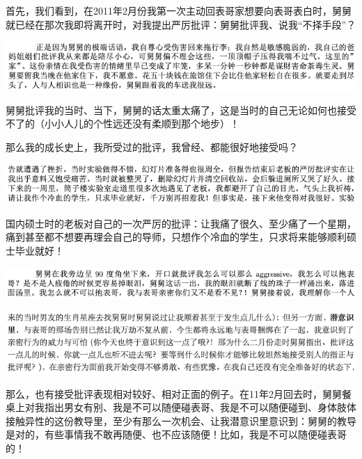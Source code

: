 \documentclass[9pt, b5paper]{article}
\begin{document}
首先，我们看到，在2011年2月份我第一次主动回表哥家想要向表哥表白时，舅舅就已经在那次我即将离开时，对我提出严厉批评：舅舅批评我、说我“不择手段”？

\begin{center}
\includegraphics[width=.9\linewidth]{./pic/backups_plans_20210412_110028.png}
\end{center}

舅舅批评我的当时、当下，舅舅的话太重太痛了，这是当时的自己无论如何也接受不了的（小小人儿的个性远还没有柔顺到那个地步）！

那么我的成长史上，我所受过的批评，我曾经、都能很好地接受吗？

\begin{center}
\includegraphics[width=.9\linewidth]{./pic/backups_plans_20210412_110225.png}
\end{center}

国内硕士时的老板对自己的一次严厉的批评：让我痛了很久、至少痛了一个星期，痛到甚至都不想要再理会自己的导师，只想作个冷血的学生，只求将来能够顺利硕士毕业就好！

\begin{center}
\includegraphics[width=.9\linewidth]{./pic/backups_plans_20210412_110604.png}
\end{center}

\begin{center}
\includegraphics[width=.9\linewidth]{./pic/backups_plans_20210412_110513.png}
\end{center}

那么，也有接受批评表现相对较好、相对正面的例子。在11年2月回去时，舅舅餐桌上对我指出男女有别、我是不可以随便碰表哥、我是不可以随便碰到、身体肢体接触异性的这份教导里，至少有那么一次机会、让我潜意识里意识到：舅舅的教导是对的，有些事情我不敢再随便、也不应该随便！比如，我是不可以随便碰表哥的！
\end{document}
